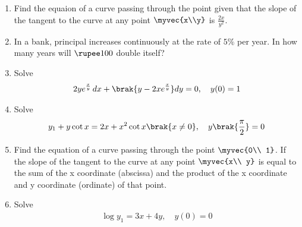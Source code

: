 \begin{enumerate}[label=\arabic*.,ref=\thesubsection.\theenumi]
\item Find the equaion of a curve passing through the point  given that the slope of the tangent to the curve at any point $\myvec{x\\y}$ is $\frac{2x}{y^2}$.
%
\item In a bank, principal increases continuously at the rate of $5\%$ per year.  In how many years will $\rupee 100$ double itself?
%
\item Solve 
%
\begin{align}
2ye^{\frac{x}{y}}\, dx + \brak{y-2xe^{\frac{x}{y}}}dy = 0, \quad y(0) = 1
\end{align}
%
\item Solve 
%
\begin{align}
y_1 + y\cot x = 2x + x^2\cot x \brak{x \ne 0}, \quad y\brak{\frac{\pi}{2}} = 0
\end{align}
%
\item Find the equation of a curve passing through the point $\myvec{0\\ 1}$. If the slope of the tangent to the curve at any point $\myvec{x\\ y}$ is equal to the sum of the x coordinate (abscissa) and the product of the x coordinate and y coordinate (ordinate) of that point.
%
\item Solve 
%
\begin{align}
\log y_1 = 3x+4y, \quad y(0) = 0
\end{align}
%
\end{enumerate}

